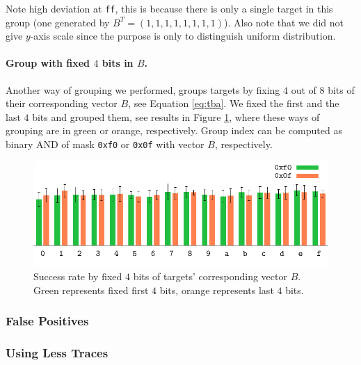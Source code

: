	Note high deviation at {\tt ff}, this is because there is only a single target in this group (one generated by $B^T = (1,1,1,1,1,1,1,1)$). Also note that we did not give $y$-axis scale since the purpose is only to distinguish uniform distribution.
	
	\paragraph{Group with fixed $4$ bits in $B$.}
	
	Another way of grouping we performed, groups targets by fixing $4$ out of $8$ bits of their corresponding vector $B$, see Equation \ref{eq:tba}. We fixed the first and the last $4$ bits and grouped them, see results in Figure \ref{fig:leaktargetotherhist}, where these ways of grouping are in green or orange, respectively. Group index can be computed as binary AND of mask {\tt 0xf0} or {\tt 0x0f} with vector $B$, respectively.
	
	\begin{figure}[h]
	\begin{center}
		\includegraphics{figures/leak_target_other/leak_0x0f_0xf0.pdf}
		\caption{Success rate by fixed $4$ bits of targets' corresponding vector $B$. Green represents fixed first $4$ bits, orange represents last $4$ bits.}
		\label{fig:leaktargetotherhist}
	\end{center}
	\end{figure}

\subsubsection{False Positives}

\subsubsection{Using Less Traces}
	
